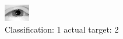 \begin{figure}[h!]
\begin{center}
\includegraphics[width=0.60\columnwidth]{figures/ID2373_class_1_target_2.png}
\end{center}
\caption{ Classification: 1 actual target: 2}
\label{fig:ID2373_class_1_target_2}
\end{figure}
